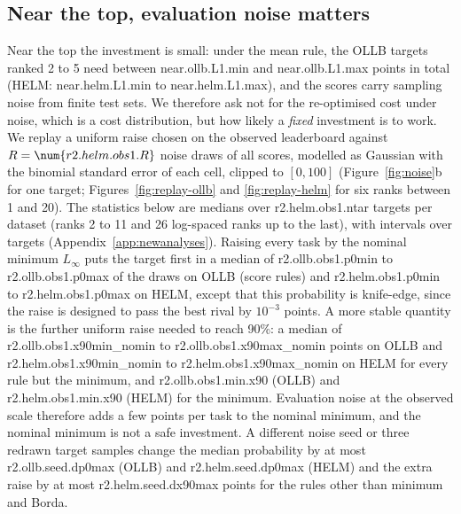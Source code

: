 \subsection{Near the top, evaluation noise matters}\label{sec:noise}
Near the top the investment is small: under the mean rule, the OLLB targets ranked 2 to 5 need between \num{near.ollb.L1.min} and \num{near.ollb.L1.max} points in total (HELM: \num{near.helm.L1.min} to \num{near.helm.L1.max}), and the scores carry sampling noise from finite test sets. We therefore ask not for the re-optimised cost under noise, which is a cost distribution, but how likely a \emph{fixed} investment is to work. We replay a uniform raise chosen on the observed leaderboard against $R=\num{r2.helm.obs1.R}$ noise draws of all scores, modelled as Gaussian with the binomial standard error of each cell, clipped to $[0,100]$ (Figure~\ref{fig:noise}b for one target; Figures~\ref{fig:replay-ollb} and \ref{fig:replay-helm} for six ranks between 1 and 20). The statistics below are medians over \num{r2.helm.obs1.ntar} targets per dataset (ranks 2 to 11 and 26 log-spaced ranks up to the last), with intervals over targets (Appendix~\ref{app:newanalyses}).
Raising every task by the nominal minimum $L_\infty$ puts the target first in a median of \num{r2.ollb.obs1.p0min} to \num{r2.ollb.obs1.p0max} of the draws on OLLB (score rules) and \num{r2.helm.obs1.p0min} to \num{r2.helm.obs1.p0max} on HELM, except that this probability is knife-edge, since the raise is designed to pass the best rival by $10^{-3}$ points. A more stable quantity is the further uniform raise needed to reach 90\%: a median of \num{r2.ollb.obs1.x90min_nomin} to \num{r2.ollb.obs1.x90max_nomin} points on OLLB and \num{r2.helm.obs1.x90min_nomin} to \num{r2.helm.obs1.x90max_nomin} on HELM for every rule but the minimum, and \num{r2.ollb.obs1.min.x90} (OLLB) and \num{r2.helm.obs1.min.x90} (HELM) for the minimum. Evaluation noise at the observed scale therefore adds a few points per task to the nominal minimum, and the nominal minimum is not a safe investment. A different noise seed or three redrawn target samples change the median probability by at most \num{r2.ollb.seed.dp0max} (OLLB) and \num{r2.helm.seed.dp0max} (HELM) and the extra raise by at most \num{r2.helm.seed.dx90max} points for the rules other than minimum and Borda.

